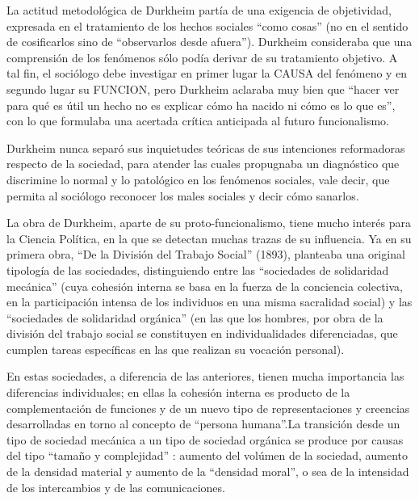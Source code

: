\documentclass[
]{book}
\begin{document}
La actitud metodológica de Durkheim partía de una exigencia de objetividad, expresada en el tratamiento de los hechos sociales ``como cosas'' (no en el sentido de cosificarlos sino de ``observarlos desde afuera''). Durkheim consideraba que una comprensión de los fenómenos sólo podía derivar de su tratamiento objetivo. A tal fin, el sociólogo debe investigar en primer lugar la CAUSA del fenómeno y en segundo lugar su FUNCION, pero Durkheim aclaraba muy bien que ``hacer ver para qué es útil un hecho no es explicar cómo ha nacido ni cómo es lo que es'', con lo que formulaba una acertada crítica anticipada al futuro funcionalismo.

Durkheim nunca separó sus inquietudes teóricas de sus intenciones reformadoras respecto de la sociedad, para atender las cuales propugnaba un diagnóstico que discrimine lo normal y lo patológico en los fenómenos sociales, vale decir, que permita al sociólogo reconocer los males sociales y decir cómo sanarlos.

La obra de Durkheim, aparte de su proto-funcionalismo, tiene mucho interés para la Ciencia Política, en la que se detectan muchas trazas de su influencia. Ya en su primera obra, ``De la División del Trabajo Social'' (1893), planteaba una original tipología de las sociedades, distinguiendo entre las ``sociedades de solidaridad mecánica'' (cuya cohesión interna se basa en la fuerza de la conciencia colectiva, en la participación intensa de los individuos en una misma sacralidad social) y las ``sociedades de solidaridad orgánica'' (en las que los hombres, por obra de la división del trabajo social se constituyen en individualidades diferenciadas, que cumplen tareas específicas en las que realizan su vocación personal).

En estas sociedades, a diferencia de las anteriores, tienen mucha importancia las diferencias individuales; en ellas la cohesión interna es producto de la complementación de funciones y de un nuevo tipo de representaciones y creencias desarrolladas en torno al concepto de ``persona humana''.La transición desde un tipo de sociedad mecánica a un tipo de sociedad orgánica se produce por causas del tipo ``tamaño y complejidad'' : aumento del volúmen de la sociedad, aumento de la densidad material y aumento de la ``densidad moral'', o sea de la intensidad de los intercambios y de las comunicaciones.
\end{document}
